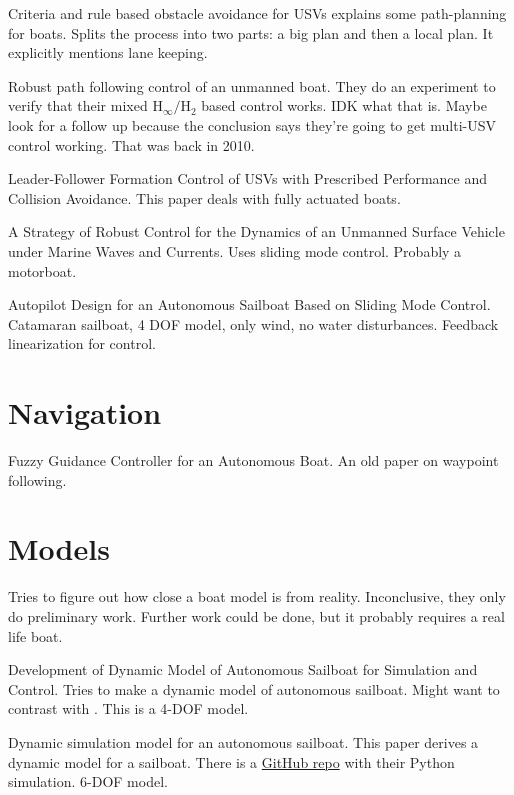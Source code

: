 \documentclass[conference]{IEEEtran}
\begin{document}
\cite{Tan2010} Criteria and rule based obstacle avoidance for USVs explains some path-planning for boats. Splits the process into two parts: a big plan and then a local plan. It explicitly mentions lane keeping.

\cite{Yu2010} Robust path following control of an unmanned boat. They do an experiment to verify that their mixed \(\mathrm{H}_\infty / \mathrm{H}_2\) based control works. IDK what that is. Maybe look for a follow up because the conclusion says they're going to get multi-USV control working. That was back in 2010.

\cite{Dai2017} Leader-Follower Formation Control of USVs with Prescribed Performance and Collision Avoidance. This paper deals with fully actuated boats.

\cite{Velueta2019} A Strategy of Robust Control for the Dynamics of an Unmanned Surface Vehicle under Marine Waves and Currents. Uses sliding mode control. Probably a motorboat. 

\cite{HelmiAbrougui2019} Autopilot Design for an Autonomous Sailboat Based on Sliding Mode Control. Catamaran sailboat, 4 DOF model, only wind, no water disturbances. Feedback linearization for control.

\section{Navigation}
\cite{Vaneck1997} Fuzzy Guidance Controller for an Autonomous Boat. An old paper on waypoint following.

 

\section{Models}
\cite{Huang2017} Tries to figure out how close a boat model is from reality. Inconclusive, they only do preliminary work. Further work could be done, but it probably requires a real life boat.

\cite{Setiawan2020} Development of Dynamic Model of Autonomous Sailboat for Simulation and Control. Tries to make a dynamic model of autonomous sailboat. Might want to contrast with \cite{Buehler2018}. This is a 4-DOF model.

\cite{Buehler2018} Dynamic simulation model for an autonomous sailboat. This paper derives a dynamic model for a sailboat. There is a \href{https://github.com/simonkohaut/stda-sailboat-simulator/tree/master/src}{GitHub repo} with their Python simulation. 6-DOF model.
\end{document}

